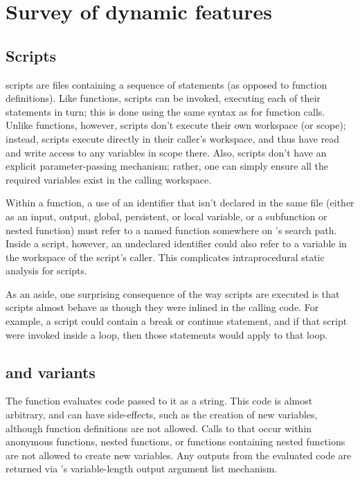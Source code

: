 \section{Survey of dynamic features}

\subsection{Scripts}

\matlab scripts are files containing a sequence of statements (as opposed to
function definitions). Like functions, scripts can be invoked, executing each
of their statements in turn; this is done using the same syntax as for function
calls. Unlike functions, however, scripts don't execute their own workspace (or
scope); instead, scripts execute directly in their caller's workspace, and thus
have read and write access to any variables in scope there. Also, scripts don't
have an explicit parameter-passing mechanism; rather, one can simply ensure all
the required variables exist in the calling workspace.

Within a function, a use of an identifier that isn't declared in the same file
(either as an input, output, global, persistent, or local variable, or a
subfunction or nested function) must refer to a named function somewhere on
\matlab's search path. Inside a script, however, an undeclared identifier could
also refer to a variable in the workspace of the script's caller. This
complicates intraprocedural static analysis for scripts.

As an aside, one surprising consequence of the way scripts are executed is that
scripts almost behave as though they were inlined in the calling code. For
example, a script could contain a break or continue statement, and if that
script were invoked inside a loop, then those statements would apply to that
loop.

\subsection{ and variants}

The  function evaluates \matlab code passed to it as a string. This
code is almost arbitrary, and can have side-effects, such as the creation of
new variables, although function definitions are not allowed. Calls to
 that occur within anonymous functions, nested functions, or
functions containing nested functions are not allowed to create new variables.
Any outputs from the evaluated code are returned via \matlab's variable-length
output argument list mechanism.

